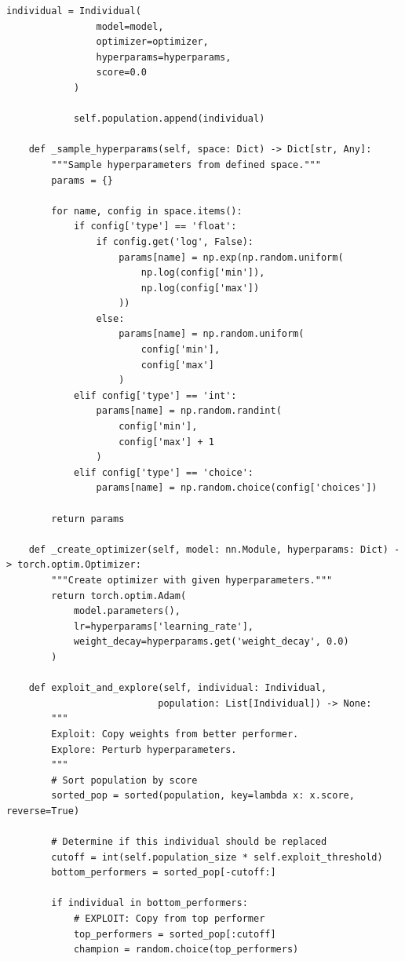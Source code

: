 \begin{lstlisting}[style=python, caption=Population-based training implementation]
            individual = Individual(
                model=model,
                optimizer=optimizer,
                hyperparams=hyperparams,
                score=0.0
            )

            self.population.append(individual)

    def _sample_hyperparams(self, space: Dict) -> Dict[str, Any]:
        """Sample hyperparameters from defined space."""
        params = {}

        for name, config in space.items():
            if config['type'] == 'float':
                if config.get('log', False):
                    params[name] = np.exp(np.random.uniform(
                        np.log(config['min']),
                        np.log(config['max'])
                    ))
                else:
                    params[name] = np.random.uniform(
                        config['min'],
                        config['max']
                    )
            elif config['type'] == 'int':
                params[name] = np.random.randint(
                    config['min'],
                    config['max'] + 1
                )
            elif config['type'] == 'choice':
                params[name] = np.random.choice(config['choices'])

        return params

    def _create_optimizer(self, model: nn.Module, hyperparams: Dict) -> torch.optim.Optimizer:
        """Create optimizer with given hyperparameters."""
        return torch.optim.Adam(
            model.parameters(),
            lr=hyperparams['learning_rate'],
            weight_decay=hyperparams.get('weight_decay', 0.0)
        )

    def exploit_and_explore(self, individual: Individual,
                           population: List[Individual]) -> None:
        """
        Exploit: Copy weights from better performer.
        Explore: Perturb hyperparameters.
        """
        # Sort population by score
        sorted_pop = sorted(population, key=lambda x: x.score, reverse=True)

        # Determine if this individual should be replaced
        cutoff = int(self.population_size * self.exploit_threshold)
        bottom_performers = sorted_pop[-cutoff:]

        if individual in bottom_performers:
            # EXPLOIT: Copy from top performer
            top_performers = sorted_pop[:cutoff]
            champion = random.choice(top_performers)


\end{lstlisting}

